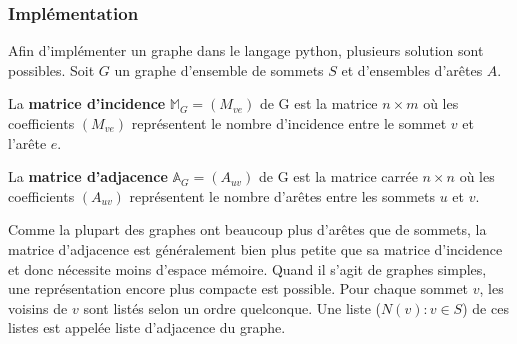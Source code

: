 \begin{frame}[fragile]
\frametitle{Implémentation}

Afin d'implémenter un graphe dans le langage python, plusieurs solution sont possibles. Soit $G$ un graphe d'ensemble de sommets $S$ et d'ensembles d'arêtes $A$. 

\begin{defi}
La \textbf{matrice d'incidence} $\mathbb{M}_G=\left(M_{ve}\right)$  de G 
est la matrice $n \times m$ où les coefficients $\left(M_{ve}\right)$ représentent le nombre d'incidence entre le sommet $v$ et l'arête $e$.

La \textbf{matrice d'adjacence} $\mathbb{A}_G=\left(A_{uv}\right)$  de G est la matrice carrée $n \times n$ où
les coefficients $\left(A_{uv}\right)$ représentent le nombre d'arêtes entre les sommets $u$ et $v$.
\end{defi}

Comme la plupart des graphes ont beaucoup plus d'arêtes que de sommets, la matrice d'adjacence est généralement bien plus petite que sa matrice d'incidence et donc nécessite moins d'espace mémoire. Quand il s'agit de graphes simples, une représentation encore plus compacte est possible. Pour chaque sommet $v$, les voisins de $v$ sont listés selon un ordre quelconque. Une liste ($N(v):v \in S$) de ces listes est appelée liste d'adjacence du graphe.
\end{frame}

